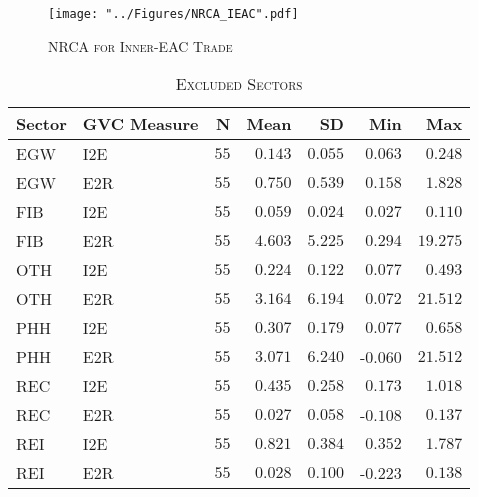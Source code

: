 \documentclass[a4paper]{article}
\begin{document}
\begin{figure}[h!]
\centering
\caption{\label{fig:NRCA_IEAC}\textsc{NRCA for Inner-EAC Trade}}
\texttt{[image: "../Figures/NRCA\_IEAC".pdf]} %
\end{figure}
\FloatBarrier

\begin{table}[h!] \centering 
  \caption{\label{tab:EXCL_SEC}\textsc{Excluded Sectors}}
  \vspace{2mm}
\begin{tabular}{ llrrrrr} \toprule
Sector & GVC Measure  & N & Mean & SD & Min & Max \\ 
\midrule
EGW & I2E & $55$ & $0.143$ & $0.055$ & $0.063$ & $0.248$ \\ 
EGW & E2R & $55$ & $0.750$ & $0.539$ & $0.158$ & $1.828$ \\ 
FIB & I2E & $55$ & $0.059$ & $0.024$ & $0.027$ & $0.110$ \\ 
FIB & E2R & $55$ & $4.603$ & $5.225$ & $0.294$ & $19.275$ \\ 
OTH & I2E & $55$ & $0.224$ & $0.122$ & $0.077$ & $0.493$ \\ 
OTH & E2R & $55$ & $3.164$ & $6.194$ & $0.072$ & $21.512$ \\ 
PHH & I2E & $55$ & $0.307$ & $0.179$ & $0.077$ & $0.658$ \\ 
PHH & E2R & $55$ & $3.071$ & $6.240$ & -$0.060$ & $21.512$ \\ 
REC & I2E & $55$ & $0.435$ & $0.258$ & $0.173$ & $1.018$ \\ 
REC & E2R & $55$ & $0.027$ & $0.058$ & -$0.108$ & $0.137$ \\ 
REI & I2E & $55$ & $0.821$ & $0.384$ & $0.352$ & $1.787$ \\ 
REI & E2R & $55$ & $0.028$ & $0.100$ & -$0.223$ & $0.138$ \\ \bottomrule
\end{tabular} 
\end{table} 
\FloatBarrier
\end{document}
